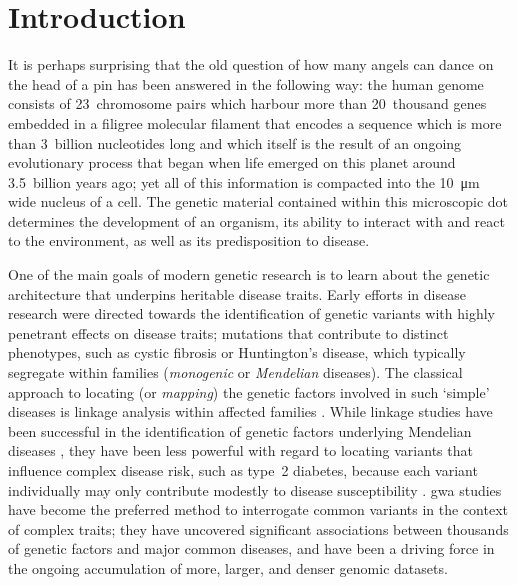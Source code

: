 
\glsresetall



{
\singlespacing
\chapter{Introduction}
\label{ch:introduction}
\minitoc
}


It is perhaps surprising that the old question of how many angels can dance on the head of a pin has been answered in the following way:
the human genome consists of 23~chromosome pairs which harbour more than 20~thousand genes embedded in a filigree molecular filament that encodes a sequence which is more than 3~billion nucleotides long and which itself is the result of an ongoing evolutionary process that began when life emerged on this planet around 3.5~billion years ago; yet all of this information is compacted into the \SI{10}{\micro\metre} wide nucleus of a cell.
The genetic material contained within this microscopic dot determines the development of an organism, its ability to interact with and react to the environment, as well as its predisposition to disease.

One of the main goals of modern genetic research is to learn about the genetic architecture that underpins heritable disease traits.
Early efforts in disease research were directed towards the identification of genetic variants with highly penetrant effects on disease traits; \eg mutations that contribute to distinct phenotypes, such as cystic fibrosis or Huntington’s disease, which typically segregate within families (\ie \emph{monogenic} or \emph{Mendelian} diseases).
The classical approach to locating (or \emph{mapping}) the genetic factors involved in such `simple' diseases is linkage analysis within affected families \citep[\eg, see][]{morris2007}.
While linkage studies have been successful in the identification of genetic factors underlying Mendelian diseases \citep{Altshuler:2008kp}, they have been less powerful with regard to locating variants that influence complex disease risk, such as type~2 diabetes, because each variant individually may only contribute modestly to disease susceptibility \citep{Risch:2000jb,Botstein:2003kf}.
\Gls{gwa} studies have become the preferred method to interrogate common variants in the context of complex traits; they have uncovered significant associations between thousands of genetic factors and major common diseases, and have been a driving force in the ongoing accumulation of more, larger, and denser genomic datasets.

